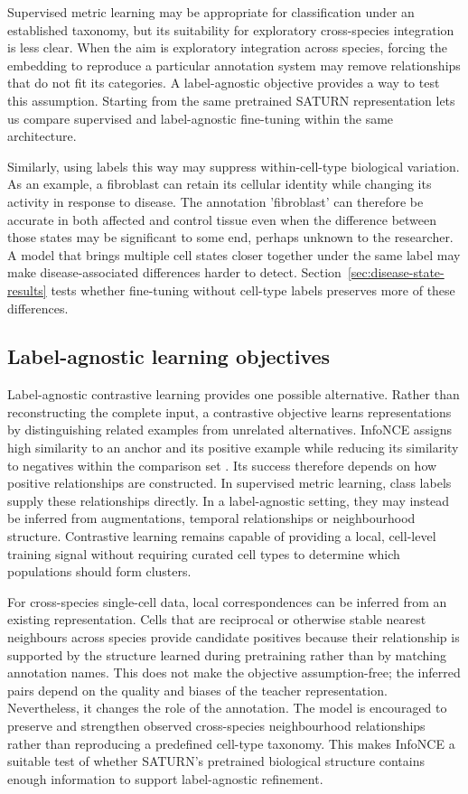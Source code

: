 \documentclass{article}
\begin{document}
Supervised metric learning may be appropriate for classification under an established taxonomy, but its suitability for exploratory cross-species integration is less clear. When the aim is exploratory integration across species, forcing the embedding to reproduce a particular annotation system may remove relationships that do not fit its categories. A label-agnostic objective provides a way to test this assumption. Starting from the same pretrained SATURN representation lets us compare supervised and label-agnostic fine-tuning within the same architecture.

Similarly, using labels this way may suppress within-cell-type biological variation. As an example, a fibroblast can retain its cellular identity while changing its activity in response to disease. The annotation 'fibroblast' can therefore be accurate in both affected and control tissue even when the difference between those states may be significant to some end, perhaps unknown to the researcher. A model that brings multiple cell states closer together under the same label may make disease-associated differences harder to detect. Section~\ref{sec:disease-state-results} tests whether fine-tuning without cell-type labels preserves more of these differences.

\subsection{Label-agnostic learning objectives}
Label-agnostic contrastive learning provides one possible alternative. Rather than reconstructing the complete input, a contrastive objective learns representations by distinguishing related examples from unrelated alternatives. InfoNCE assigns high similarity to an anchor and its positive example while reducing its similarity to negatives within the comparison set \cite{InfoNCE}. Its success therefore depends on how positive relationships are constructed. In supervised metric learning, class labels supply these relationships directly. In a label-agnostic setting, they may instead be inferred from augmentations, temporal relationships or neighbourhood structure. Contrastive learning remains capable of providing a local, cell-level training signal without requiring curated cell types to determine which populations should form clusters.

For cross-species single-cell data, local correspondences can be inferred from an existing representation. Cells that are reciprocal or otherwise stable nearest neighbours across species provide candidate positives because their relationship is supported by the structure learned during pretraining rather than by matching annotation names. This does not make the objective assumption-free; the inferred pairs depend on the quality and biases of the teacher representation. Nevertheless, it changes the role of the annotation. The model is encouraged to preserve and strengthen observed cross-species neighbourhood relationships rather than reproducing a predefined cell-type taxonomy. This makes InfoNCE a suitable test of whether SATURN’s pretrained biological structure contains enough information to support label-agnostic refinement.
\end{document}
